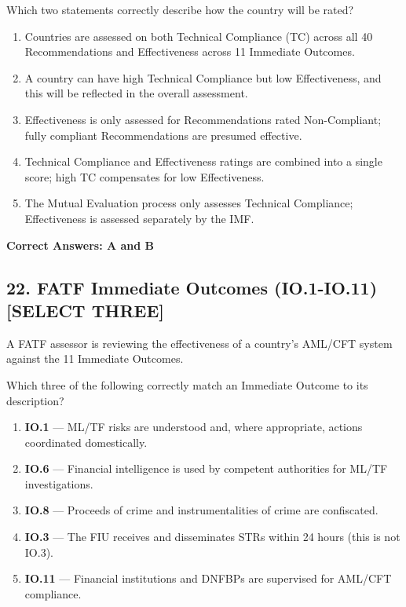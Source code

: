 \documentclass[11pt,a4paper]{article}
\begin{document}
	Which two statements correctly describe how the country will be rated?
	
	\begin{enumerate}[label=\Alph*.]
		\item Countries are assessed on both Technical Compliance (TC) across all 40 Recommendations and Effectiveness across 11 Immediate Outcomes.
		\item A country can have high Technical Compliance but low Effectiveness, and this will be reflected in the overall assessment.
		\item Effectiveness is only assessed for Recommendations rated Non-Compliant; fully compliant Recommendations are presumed effective.
		\item Technical Compliance and Effectiveness ratings are combined into a single score; high TC compensates for low Effectiveness.
		\item The Mutual Evaluation process only assesses Technical Compliance; Effectiveness is assessed separately by the IMF.
	\end{enumerate}
	
	\textbf{Correct Answers: A and B}
	
	\subsection{22. FATF Immediate Outcomes (IO.1-IO.11) \textnormal{[SELECT THREE]}}
	
	A FATF assessor is reviewing the effectiveness of a country's AML/CFT system against the 11 Immediate Outcomes.
	
	Which three of the following correctly match an Immediate Outcome to its description?
	
	\begin{enumerate}[label=\Alph*.]
		\item \textbf{IO.1} — ML/TF risks are understood and, where appropriate, actions coordinated domestically.
		\item \textbf{IO.6} — Financial intelligence is used by competent authorities for ML/TF investigations.
		\item \textbf{IO.8} — Proceeds of crime and instrumentalities of crime are confiscated.
		\item \textbf{IO.3} — The FIU receives and disseminates STRs within 24 hours (this is not IO.3).
		\item \textbf{IO.11} — Financial institutions and DNFBPs are supervised for AML/CFT compliance.
	\end{enumerate}
	
\end{document}
